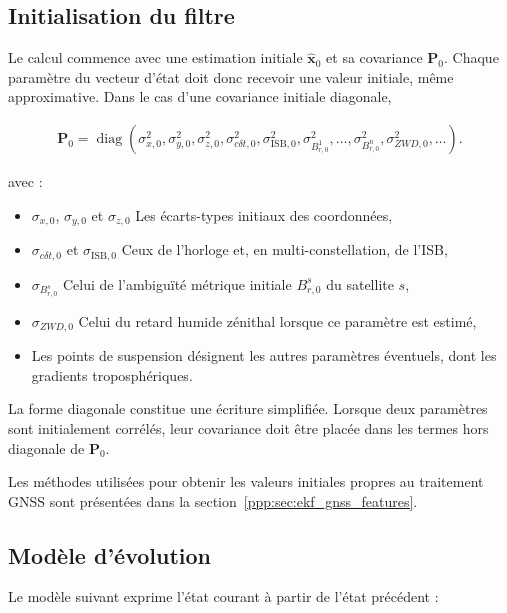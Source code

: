 \subsection{Initialisation du filtre}
\label{ann:sec:ekf_initialization}

Le calcul commence avec une estimation initiale
$\widehat{\mathbf x}_0$ et sa covariance $\mathbf P_0$. Chaque paramètre du
vecteur d'état doit donc recevoir une valeur initiale, même approximative. Dans
le cas d'une covariance initiale diagonale,

\begin{align}
\mathbf P_0
=
\operatorname{diag}
\left(
\sigma_{x,0}^2,
\sigma_{y,0}^2,
\sigma_{z,0}^2,
\sigma_{c\delta t,0}^2,
\sigma_{\mathrm{ISB},0}^2,
\sigma_{B_{r,0}^1}^2,\ldots,
\sigma_{B_{r,0}^n}^2,
\sigma_{ZWD,0}^2,\ldots
\right).
\label{ann:eq:ekf_initial_covariance}
\end{align}

avec :

\begin{itemize}
    \item $\sigma_{x,0}$, $\sigma_{y,0}$ et $\sigma_{z,0}$ Les écarts-types
    initiaux des coordonnées,
    \item $\sigma_{c\delta t,0}$ et $\sigma_{\mathrm{ISB},0}$ Ceux de
    l'horloge et, en multi-constellation, de l'ISB,
    \item $\sigma_{B_{r,0}^s}$ Celui de l'ambiguïté métrique initiale
    $B_{r,0}^s$ du satellite $s$,
    \item $\sigma_{ZWD,0}$ Celui du retard humide zénithal lorsque ce paramètre
    est estimé,
    \item Les points de suspension désignent les autres paramètres éventuels, dont
    les gradients troposphériques.
\end{itemize}

La forme diagonale constitue une écriture simplifiée. Lorsque deux paramètres
sont initialement corrélés, leur covariance doit être placée dans les termes
hors diagonale de $\mathbf P_0$.

Les méthodes utilisées pour
obtenir les valeurs initiales propres au traitement GNSS sont présentées dans
la section~\ref{ppp:sec:ekf_gnss_features}.

\subsection{Modèle d'évolution}

Le modèle suivant exprime l'état courant à partir de l'état précédent :

